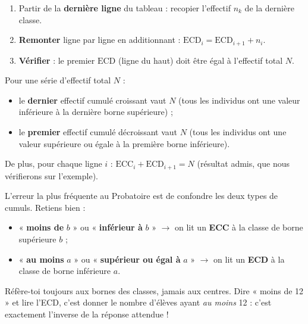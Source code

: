 \documentclass[11pt]{article}
\newcommand{\cle}[1]{{\popxbold\color{popdark}#1}}
\newcounter{popsec}
\newcounter{popsub}
\newcommand{\courssub}[1]{%
  \stepcounter{popsub}%
  \par\vspace{9pt}\noindent{\popxbold\fontsize{11.5}{13}\selectfont\color{popink}{\color{poporange}\thepopsec.\thepopsub}\hspace{6pt}#1}\par\nopagebreak\vspace{4pt}
}
\begin{document}
\begin{methode}
\begin{enumerate}
\item Partir de la \textbf{dernière ligne} du tableau : recopier l'effectif $n_k$ de la dernière classe.
\item \textbf{Remonter} ligne par ligne en additionnant : $\mathrm{ECD}_i = \mathrm{ECD}_{i+1} + n_i$.
\item \textbf{Vérifier} : le premier $\mathrm{ECD}$ (ligne du haut) doit être égal à l'effectif total $N$.
\end{enumerate}
\end{methode}

\begin{propriete}
Pour une série d'effectif total $N$ :
\begin{itemize}
\item le \textbf{dernier} effectif cumulé croissant vaut $N$ (tous les individus ont une valeur inférieure à la dernière borne supérieure) ;
\item le \textbf{premier} effectif cumulé décroissant vaut $N$ (tous les individus ont une valeur supérieure ou égale à la première borne inférieure).
\end{itemize}
De plus, pour chaque ligne $i$ : $\mathrm{ECC}_i + \mathrm{ECD}_{i+1} = N$ (résultat admis, que nous vérifierons sur l'exemple).
\end{propriete}

\begin{attention}
L'erreur la plus fréquente au Probatoire est de confondre les deux types de cumuls. Retiens bien :
\begin{itemize}
\item « \textbf{moins de} $b$ » ou « \textbf{inférieur à} $b$ » $\longrightarrow$ on lit un \textbf{ECC} à la classe de borne supérieure $b$ ;
\item « \textbf{au moins} $a$ » ou « \textbf{supérieur ou égal à} $a$ » $\longrightarrow$ on lit un \textbf{ECD} à la classe de borne inférieure $a$.
\end{itemize}
Réfère-toi toujours aux \cle{bornes} des classes, jamais aux centres. Dire « moins de 12 » et lire l'ECD, c'est donner le nombre d'élèves ayant \emph{au moins} 12 : c'est exactement l'inverse de la réponse attendue !
\end{attention}

\courssub{Fréquences cumulées}
\end{document}
